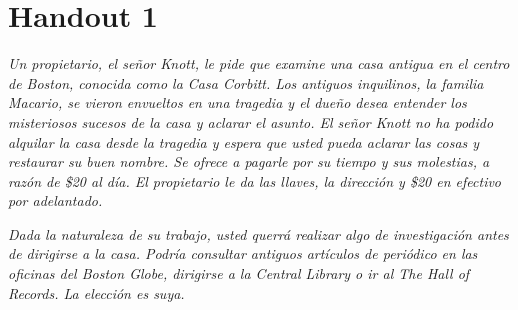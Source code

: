 \chapter{Handout 1}

\emph{Un propietario, el señor Knott, le pide que examine una casa antigua en el
centro de Boston, conocida como la Casa Corbitt. Los antiguos inquilinos, la
familia Macario, se vieron envueltos en una tragedia y el dueño desea entender
los misteriosos sucesos de la casa y aclarar el asunto. El señor Knott no ha
podido alquilar la casa desde la tragedia y espera que usted pueda aclarar las
cosas y restaurar su buen nombre. Se ofrece a pagarle por su tiempo y sus
molestias, a razón de \$20 al día. El propietario le da las llaves, la dirección
y \$20  en efectivo por adelantado.}

\emph{Dada la naturaleza de su trabajo, usted querrá realizar algo de
investigación antes de dirigirse a la casa. Podría consultar antiguos artículos
de periódico en las oficinas del \emph{Boston Globe}, dirigirse a la
\emph{Central Library} o ir al \emph{The Hall of Records}. La elección es suya.}

